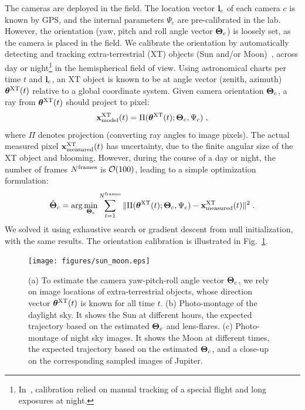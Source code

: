 \documentclass[runningheads]{llncs}
\begin{document}
The cameras are deployed in the field. The location vector ${\bf l}_c$
of each camera $c$ is known by GPS, and the internal parameters $\Psi_c$ are pre-calibrated in the lab. However, the orientation (yaw, pitch and roll angle vector ${\bf \Theta}_c$) is loosely set, as the camera is placed in the field. We calibrate the orientation by automatically detecting and tracking extra-terrestrial (XT) objects (Sun and/or Moon)~\cite{Seiz2002,lalonde}, across day or night\footnote{In~\cite{Seiz2002}, calibration relied on manual tracking of a special flight and long exposures at night.} in the hemispherical field of view.  Using astronomical charts per time $t$ and ${\bf l}_c$, an XT object is known to be at angle vector (zenith, azimuth) ${\bm \theta}^{\rm XT}(t)$ relative to a global coordinate system. Given camera orientation ${\bf \Theta}_c$, a ray from ${\bm \theta}^{\rm XT}(t)$ should project to pixel:
\begin{equation}
{\bf x}^{\rm XT}_{\rm model}(t) = {\Pi}({\bm \theta}^{\rm XT}(t);{\bf \Theta}_c,\Psi_c)
\;,
 \label{eq:xt}
\end{equation}
where ${\Pi}$ denotes projection (converting ray angles to image pixels).
The actual measured pixel ${\bf x}^{\rm XT}_{\rm measured}(t)$ has uncertainty, due to the finite angular size of the XT object and blooming. However, during the course of a day or night, the number of frames
  $N^{\rm frames}$ is ${\cal O}(100)$, leading to a simple optimization formulation:
\begin{equation}
 \hat{\bf \Theta}_c=\arg\min_{{\bf \Theta}_c}
 \sum_{t=1}^{N^{\rm frames}}
 \|{\Pi}({\bm \theta}^{\rm XT}(t);{\bf \Theta}_c,\Psi_c) - {\bf x}^{\rm XT}_{\rm measured}(t)\|^2
\;.
 \label{eq:hatThetac}
\end{equation}
We solved it using exhaustive search or gradient descent from null initialization, with the same results. The orientation calibration is illustrated in Fig.~\ref{fig:sunmotion}.
\begin{figure}[t!]
\begin{center}
   \texttt{[image: figures/sun\_moon.eps]}
\end{center}
   \vspace{-0.6cm}
   \caption{(a) To estimate the camera yaw-pitch-roll angle vector ${\bf \Theta}_c$, we rely on
   image locations of extra-terrestrial objects, whose direction vector ${\bm \theta}^{\rm XT}(t)$
   is known for all time $t$. (b) Photo-montage of the daylight sky. It shows the Sun at different hours, the expected trajectory based on the estimated ${\bf \Theta}_c$ and lens-flares. (c)
   Photo-montage of night sky images. It shows the Moon at different times, the expected trajectory based on the estimated ${\bf \Theta}_c$, and a close-up on the corresponding sampled images of Jupiter.}
\label{fig:sunmotion}
\end{figure}
\end{document}
